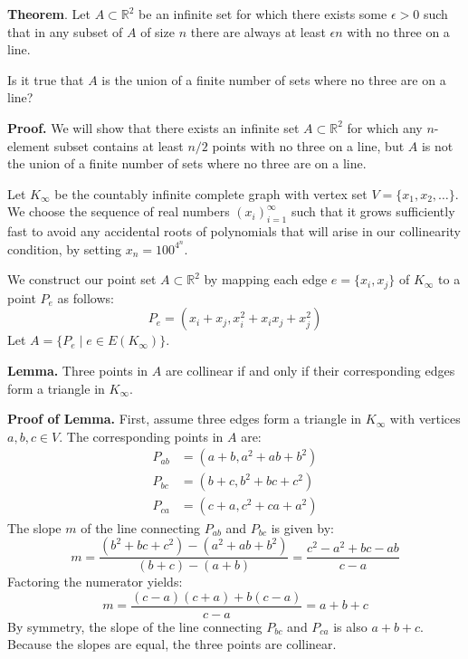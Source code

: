\noindent \textbf{Theorem}. Let $A\subset\mathbb{R}^2$
 be an infinite set for which there exists some $\epsilon > 0$
 such that in any subset of $A$
 of size $n$
 there are always at least $\epsilon n$
 with no three on a line.

Is it true that $A$
 is the union of a finite number of sets where no three are on a line?
        
\noindent \textbf{Proof.} We will show that there exists an infinite set $A \subset \mathbb{R}^2$ for which any $n$-element subset contains at least $n/2$ points with no three on a line, but $A$ is not the union of a finite number of sets where no three are on a line.

Let $K_\infty$ be the countably infinite complete graph with vertex set $V = \{x_1, x_2, \dots\}$. We choose the sequence of real numbers $(x_i)_{i=1}^\infty$ such that it grows sufficiently fast to avoid any accidental roots of polynomials that will arise in our collinearity condition, by setting $x_n = 100^{4^n}$.

We construct our point set $A \subset \mathbb{R}^2$ by mapping each edge $e = \{x_i, x_j\}$ of $K_\infty$ to a point $P_e$ as follows:
\begin{equation}
P_e = (x_i + x_j, x_i^2 + x_i x_j + x_j^2)
\end{equation}
Let $A = \{ P_e \mid e \in E(K_\infty) \}$.

\textbf{Lemma.}
Three points in $A$ are collinear if and only if their corresponding edges form a triangle in $K_\infty$.

\textbf{Proof of Lemma.} First, assume three edges form a triangle in $K_\infty$ with vertices $a, b, c \in V$. The corresponding points in $A$ are:
\begin{align*}
P_{ab} &= (a+b, a^2+ab+b^2) \\
P_{bc} &= (b+c, b^2+bc+c^2) \\
P_{ca} &= (c+a, c^2+ca+a^2)
\end{align*}
The slope $m$ of the line connecting $P_{ab}$ and $P_{bc}$ is given by:
\begin{equation*}
m = \frac{(b^2+bc+c^2) - (a^2+ab+b^2)}{(b+c) - (a+b)} = \frac{c^2 - a^2 + bc - ab}{c - a}
\end{equation*}
Factoring the numerator yields:
\begin{equation*}
m = \frac{(c-a)(c+a) + b(c-a)}{c-a} = a+b+c
\end{equation*}
By symmetry, the slope of the line connecting $P_{bc}$ and $P_{ca}$ is also $a+b+c$. Because the slopes are equal, the three points are collinear.

